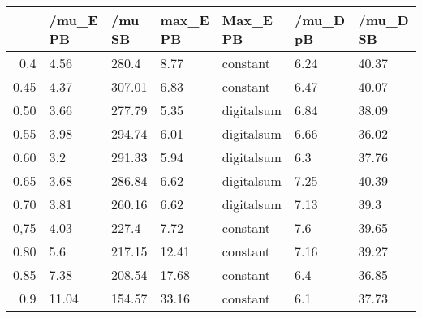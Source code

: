 \begin{table}[ht]
\centering
\begin{tabular}{rllllll}
  \hline
 & /mu\_E PB & /mu SB & max\_E PB & Max\_E PB & /mu\_D pB & /mu\_D SB \\ 
  \hline
0.4 & 4.56 & 280.4 & 8.77 & constant & 6.24 & 40.37 \\ 
  0.45 & 4.37 & 307.01 & 6.83 & constant & 6.47 & 40.07 \\ 
  0.50 & 3.66 & 277.79 & 5.35 & digitalsum & 6.84 & 38.09 \\ 
  0.55 & 3.98 & 294.74 & 6.01 & digitalsum & 6.66 & 36.02 \\ 
  0.60 & 3.2 & 291.33 & 5.94 & digitalsum & 6.3 & 37.76 \\ 
  0.65 & 3.68 & 286.84 & 6.62 & digitalsum & 7.25 & 40.39 \\ 
  0.70 & 3.81 & 260.16 & 6.62 & digitalsum & 7.13 & 39.3 \\ 
  0,75 & 4.03 & 227.4 & 7.72 & constant & 7.6 & 39.65 \\ 
  0.80 & 5.6 & 217.15 & 12.41 & constant & 7.16 & 39.27 \\ 
  0.85 & 7.38 & 208.54 & 17.68 & constant & 6.4 & 36.85 \\ 
  0.9 & 11.04 & 154.57 & 33.16 & constant & 6.1 & 37.73 \\ 
   \hline
\end{tabular}
\end{table}
